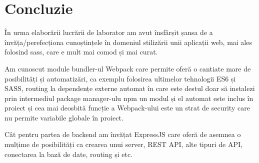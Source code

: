 \section*{Concluzie}

În urma elaborării lucrării de laborator am avut însfârșit șansa de a învăța/perefecționa cunoștințele în domeniul stilizării unii aplicații web, mai ales folosind sass, care e mult mai comod și mai curat. \par
Am cunoscut module bundler-ul Webpack \cite{webpack} care permite oferă o cantiate mare de posibilități și automatizări, ca exemplu folosirea ultimelor tehnologii ES6 și SASS, routing la dependențe externe automat în care este destul doar să instalezi prin intermediul package manager-ulu npm un modul și el automat este inclus în proiect și cea mai deosbită funcție a Webpack-ului este un strat de security care nu permite variabile globale în proiect. \par
Cât pentru partea de backend am învățat ExpressJS\cite{expressjs} care oferă de asemnea o mulțime de posibilități ca crearea unui server, REST API, alte tipuri de API, conectarea la bază de date, routing și etc.




\clearpage